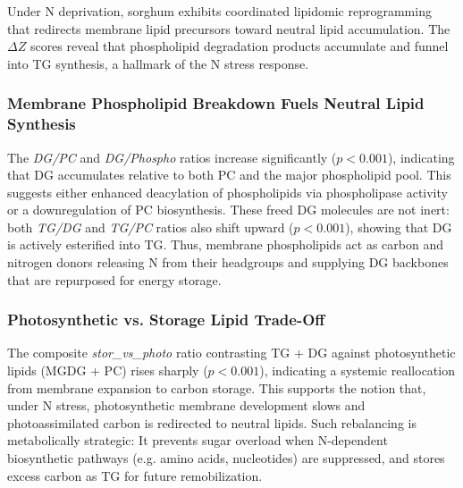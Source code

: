 \documentclass[10pt,letterpaper]{article}
\begin{document}
Under N deprivation, sorghum exhibits coordinated lipidomic reprogramming that redirects membrane lipid precursors toward neutral lipid accumulation. The $\Delta Z$ scores reveal that phospholipid degradation products accumulate and funnel into TG synthesis, a hallmark of the N stress response.

\subsubsection{Membrane Phospholipid Breakdown Fuels Neutral Lipid Synthesis}

The \textit{DG/PC} and \textit{DG/Phospho} ratios increase significantly ($p < 0.001$), indicating that DG accumulates relative to both PC and the major phospholipid pool. This suggests either enhanced deacylation of phospholipids via phospholipase activity or a downregulation of PC biosynthesis. These freed DG molecules are not inert: both \textit{TG/DG} and \textit{TG/PC} ratios also shift upward ($p < 0.001$), showing that DG is actively esterified into TG. Thus, membrane phospholipids act as carbon and nitrogen donors releasing N from their headgroups and supplying DG backbones that are repurposed for energy storage.

\subsubsection{Photosynthetic vs. Storage Lipid Trade-Off}

The composite \textit{stor\_vs\_photo} ratio contrasting TG + DG against photosynthetic lipids (MGDG + PC) rises sharply ($p < 0.001$), indicating a systemic reallocation from membrane expansion to carbon storage. This supports the notion that, under N stress, photosynthetic membrane development slows and photoassimilated carbon is redirected to neutral lipids. Such rebalancing is metabolically strategic: It prevents sugar overload when N-dependent biosynthetic pathways (e.g. amino acids, nucleotides) are suppressed, and stores excess carbon as TG for future remobilization.
\end{document}
